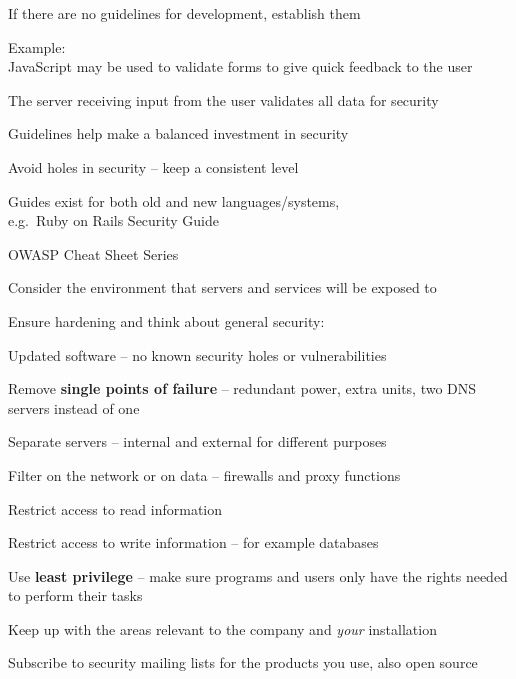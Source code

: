 \documentclass[Screen16to9,17pt]{foils}
\begin{document}

\begin{list2}
\item If there are no guidelines for development, establish them
\item Example:\\
JavaScript may be used to validate forms to give quick feedback to the user
\item The server receiving input from the user validates all data for security
\item Guidelines help make a balanced investment in security
\item Avoid holes in security -- keep a consistent level
\item Guides exist for both old and new languages/systems,\\
e.g.\ Ruby on Rails Security Guide\\
\item OWASP Cheat Sheet Series\\
\end{list2}


\begin{list1}
\item Consider the environment that servers and services will be exposed to
\item Ensure hardening and think about general security:
  \begin{list2}
  \item Updated software -- no known security holes or vulnerabilities
  \item Remove {\bfseries single points of failure} -- redundant power, extra units, two DNS servers instead of one
  \item Separate servers -- internal and external for different purposes
  \item Filter on the network or on data -- firewalls and proxy functions
  \item Restrict access to read information
  \item Restrict access to write information -- for example databases
  \item Use {\bfseries least privilege} -- make sure programs and users only have the rights needed to perform their tasks
  \item Keep up with the areas relevant to the company and \emph{your} installation
  \end{list2}
\item Subscribe to security mailing lists for the products you use, also open source
\end{list1}
\end{document}
